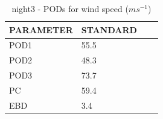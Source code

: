 \begin{table}[h!]
\begin{center}
\begin{tabular}{|l|l|l|l|}
\hline
\multicolumn{1}{|c|}{\cellcolor[HTML]{C0C0C0}\textbf{PARAMETER}} & \multicolumn{1}{c|}{\cellcolor[HTML]{C0C0C0}\textbf{STANDARD}} \\
\hline
\cellcolor[HTML]{C0C0C0}POD1  & 55.5                                \\
\cellcolor[HTML]{C0C0C0}POD2  & 48.3                                \\
\cellcolor[HTML]{C0C0C0}POD3  & 73.7                                \\
\cellcolor[HTML]{C0C0C0}PC    & 59.4                                  \\
\cellcolor[HTML]{C0C0C0}EBD   & 3.4                                 \\
\hline
\end{tabular}
\caption{night3 - PODs for wind speed ($m s^{-1}$)}
\label{tab:podws:night3}
\end{center}
\end{table}
